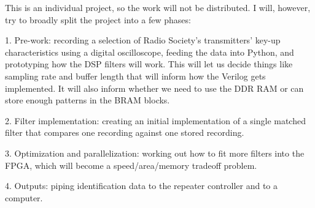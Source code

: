 \documentclass{article}
\begin{document}
This is an individual project, so the work will not be distributed. I will, however, try to broadly split the project into a few phases:

1. Pre-work: recording a selection of Radio Society's transmitters' key-up characteristics using a digital oscilloscope, feeding the data into Python, and prototyping how the DSP filters will work. This will let us decide things like sampling rate and buffer length that will inform how the Verilog gets implemented. It will also inform whether we need to use the DDR RAM or can store enough patterns in the BRAM blocks.

2. Filter implementation: creating an initial implementation of a single matched filter that compares one recording against one stored recording.

3. Optimization and parallelization: working out how to fit more filters into the FPGA, which will become a speed/area/memory tradeoff problem.

4. Outputs: piping identification data to the repeater controller and to a computer.
\end{document}
